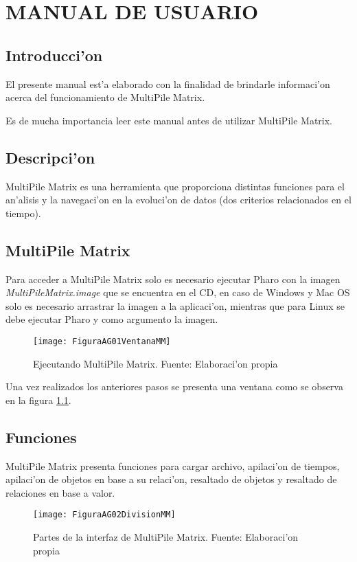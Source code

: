 \chapter{MANUAL DE USUARIO}
\label{ManualU}
\section{Introducci'on}
El presente manual est'a elaborado con la finalidad de brindarle informaci'on acerca del funcionamiento de MultiPile Matrix.

Es de mucha importancia leer este manual antes de utilizar MultiPile Matrix.

\section{Descripci'on}
MultiPile Matrix es una herramienta que proporciona distintas funciones para el an'alisis y la navegaci'on en la evoluci'on de datos (dos criterios relacionados en el tiempo).

\section{MultiPile Matrix}
Para acceder a MultiPile Matrix solo es necesario ejecutar Pharo con la imagen \emph{MultiPileMatrix.image} que se encuentra en el CD, en caso de Windows y Mac OS solo es necesario arrastrar la imagen a la aplicaci'on, mientras que para Linux se debe ejecutar Pharo y como argumento la imagen.

\begin{figure}[h]
    \centering
    \texttt{[image: FiguraAG01VentanaMM]}
    \caption{Ejecutando MultiPile Matrix. Fuente: Elaboraci'on propia}
    \label{fig:VentanaMM}
\end{figure}

Una vez realizados los anteriores pasos se presenta una ventana como se observa en la figura \ref{fig:VentanaMM}.

\section{Funciones}
MultiPile Matrix presenta funciones para cargar archivo, apilaci'on de tiempos, apilaci'on de objetos en base a su relaci'on, resaltado de objetos y resaltado de relaciones en base a valor. 

\begin{figure}[h]
    \centering
    \texttt{[image: FiguraAG02DivisionMM]}
    \caption{Partes de la interfaz de MultiPile Matrix. Fuente: Elaboraci'on propia}
    \label{fig:DivisionMM}
\end{figure}

